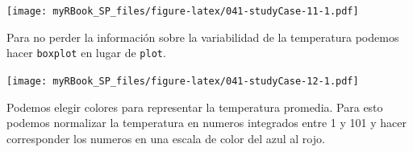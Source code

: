 \documentclass[
]{book}
\newenvironment{Shaded}{\begin{snugshade}}{\end{snugshade}}
\newcommand{\DataTypeTok}[1]{\textcolor[rgb]{0.13,0.29,0.53}{#1}}
\newcommand{\DecValTok}[1]{\textcolor[rgb]{0.00,0.00,0.81}{#1}}
\newcommand{\KeywordTok}[1]{\textcolor[rgb]{0.13,0.29,0.53}{\textbf{#1}}}
\newcommand{\NormalTok}[1]{#1}
\newcommand{\OperatorTok}[1]{\textcolor[rgb]{0.81,0.36,0.00}{\textbf{#1}}}
\newcommand{\StringTok}[1]{\textcolor[rgb]{0.31,0.60,0.02}{#1}}
\begin{document}
\texttt{[image: myRBook\_SP\_files/figure-latex/041-studyCase-11-1.pdf]}

Para no perder la información sobre la variabilidad de la temperatura podemos hacer \texttt{boxplot} en lugar de \texttt{plot}.

\begin{Shaded}
\end{Shaded}

\texttt{[image: myRBook\_SP\_files/figure-latex/041-studyCase-12-1.pdf]}

Podemos elegir colores para representar la temperatura promedia. Para esto podemos normalizar la temperatura en numeros integrados entre 1 y 101 y hacer corresponder los numeros en una escala de color del azul al rojo.

\begin{Shaded}
\end{Shaded}
\end{document}
